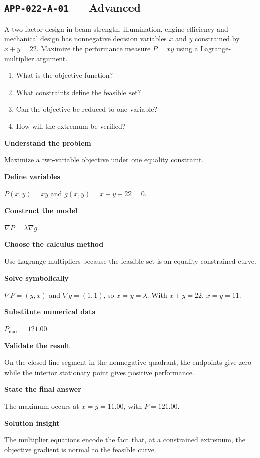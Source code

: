 \documentclass[11pt]{book}
\newcommand{\pid}[1]{\texttt{#1}}
\begin{document}
\subsection*{\pid{APP-022-A-01} — Advanced}
\begin{problembox}
A two-factor design in beam strength, illumination, engine efficiency and mechanical design has nonnegative decision variables $x$ and $y$ constrained by $x+y=22$. Maximize the performance measure $P=xy$ using a Lagrange-multiplier argument.
\end{problembox}
\begin{promptbox}\begin{enumerate}
\item What is the objective function?
\item What constraints define the feasible set?
\item Can the objective be reduced to one variable?
\item How will the extremum be verified?
\end{enumerate}\end{promptbox}
\begin{solutionbox}
\textbf{Understand the problem}\par Maximize a two-variable objective under one equality constraint.\par\medskip
\textbf{Define variables}\par $P(x,y)=xy$ and $g(x,y)=x+y-22=0$.\par\medskip
\textbf{Construct the model}\par $\nabla P=\lambda\nabla g$.\par\medskip
\textbf{Choose the calculus method}\par Use Lagrange multipliers because the feasible set is an equality-constrained curve.\par\medskip
\textbf{Solve symbolically}\par $\nabla P=(y,x)$ and $\nabla g=(1,1)$, so $x=y=\lambda$. With $x+y=22$, $x=y=11$.\par\medskip
\textbf{Substitute numerical data}\par $P_{\max}=121.00$.\par\medskip
\textbf{Validate the result}\par On the closed line segment in the nonnegative quadrant, the endpoints give zero while the interior stationary point gives positive performance.\par\medskip
\textbf{State the final answer}\par The maximum occurs at $x=y=11.00$, with $P=121.00$.\par\medskip
\textbf{Solution insight}\par The multiplier equations encode the fact that, at a constrained extremum, the objective gradient is normal to the feasible curve.\par\medskip
\end{solutionbox}
\end{document}
